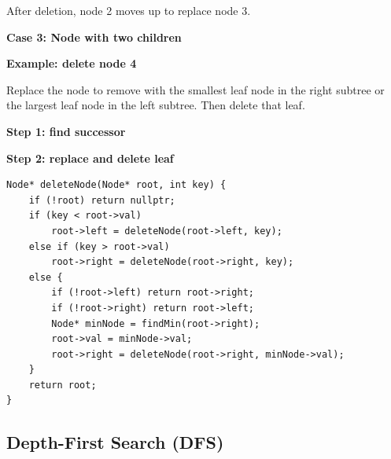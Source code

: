 \documentclass{article}
\begin{document}
After deletion, node 2 moves up to replace node 3.

\bigskip

\textbf{Case 3: Node with two children}  

\textbf{Example: delete node 4}

Replace the node to remove with the smallest leaf node in the right subtree or the largest leaf node in the left subtree. Then delete that leaf.


\textbf{Step 1: find successor}

\begin{center}
\end{center}

\textbf{Step 2: replace and delete leaf}

\begin{center}
\end{center}

\begin{verbatim}
Node* deleteNode(Node* root, int key) {
    if (!root) return nullptr;
    if (key < root->val)
        root->left = deleteNode(root->left, key);
    else if (key > root->val)
        root->right = deleteNode(root->right, key);
    else {
        if (!root->left) return root->right;
        if (!root->right) return root->left;
        Node* minNode = findMin(root->right);
        root->val = minNode->val;
        root->right = deleteNode(root->right, minNode->val);
    }
    return root;
}
\end{verbatim}


\subsection{Depth-First Search (DFS)}
\end{document}
